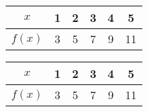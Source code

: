 \documentclass[11pt]{article}
\begin{document}
\begin{tabular}{c|ccccc}
$x$ & 1 & 2 & 3 & 4 & 5\\ \hline
$f(x)$ & 3 & 5 & 7 & 9 & 11
\end{tabular}


\begin{tabular}{|c|ccccc|}
\hline
$x$ & 1 & 2 & 3 & 4 & 5\\ \hline
$f(x)$ & 3 & 5 & 7 & 9 & 11\\ \hline
\end{tabular}
\end{document}
